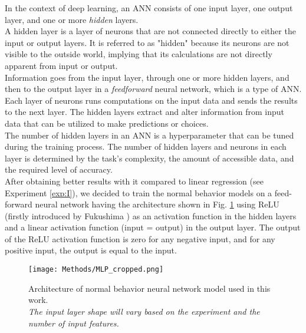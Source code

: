     In the context of deep learning, an ANN consists of one input layer, one output layer, and one or more \emph{hidden} layers.\\
    A hidden layer is a layer of neurons that are not connected directly to either the input or output layers. 
    It is referred to as "hidden" because its neurons are not visible to the outside world, implying that its calculations are not directly apparent from input or output.\\
    Information goes from the input layer, through one or more hidden layers, and then to the output layer in a \emph{feedforward} neural network, which is a type of ANN. 
    Each layer of neurons runs computations on the input data and sends the results to the next layer. The hidden layers extract and alter information from input data that can be 
    utilized to make predictions or choices.\\
    The number of hidden layers in an ANN is a hyperparameter that can be tuned during the training process.
    The number of hidden layers and neurons in each layer is determined by the task's complexity, the amount of accessible data, and the required level of accuracy.\\
    After obtaining better results with it compared to linear regression (see Experiment \ref{exp:I}), we decided to train the normal behavior models
    on a feed-forward neural network having the architecture shown in Fig. \ref{fig:MLP} using ReLU (firstly introduced by Fukushima \cite{Fukushima}) 
    as an activation function in the hidden layers and a linear activation function (input = output) in the output layer. 
    The output of the ReLU activation function is zero for any negative input, and for any positive input, the output is equal to the input.

    \begin{figure}[h]
      \begin{center}
        \texttt{[image: Methods/MLP\_cropped.png]}
      \end{center}
      \caption{Architecture of normal behavior neural network model used in this work. \\
      \emph{The input layer shape will vary based on the experiment and the number of input features.}}
      \label{fig:MLP}
    \end{figure}

    \clearpage

